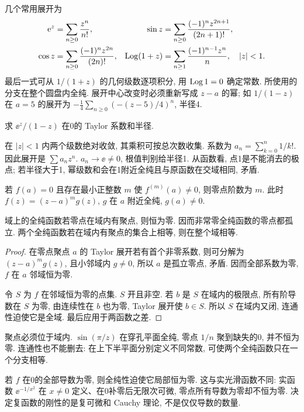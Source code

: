 几个常用展开为
\begin{align*}
\mathrm e^z&=\sum_{n\ge0}\frac{z^n}{n!},&
\sin z&=\sum_{n\ge0}\frac{(-1)^nz^{2n+1}}{(2n+1)!},\\
\cos z&=\sum_{n\ge0}\frac{(-1)^nz^{2n}}{(2n)!},&
\operatorname{Log}(1+z)&=\sum_{n\ge1}\frac{(-1)^{n-1}z^n}{n},\quad |z|<1.
\end{align*}
最后一式可从 $1/(1+z)$ 的几何级数逐项积分, 用 $\operatorname{Log}1=0$ 确定常数. 所使用的分支在整个圆盘内全纯. 展开中心改变时必须重新写成 $z-a$ 的幂; 如 $1/(1-z)$ 在 $a=5$ 的展开为 $-\tfrac14\sum_{n\ge0}(-(z-5)/4)^n$, 半径4.

\begin{example}
求 $\ee^z/(1-z)$ 在0的 Taylor 系数和半径.
\end{example}
\begin{solution}
在 $|z|<1$ 内两个级数绝对收敛, 其乘积可按总次数收集. 系数为 $a_n=\sum_{k=0}^n1/k!$. 因此展开是 $\sum a_nz^n$. $a_n\to\ee\ne0$, 根值判别给半径1. 从函数看, 点1是不能消去的极点; 若半径大于1, 幂级数和会在1附近全纯且与原函数在交域相同, 矛盾.
\end{solution}

\begin{definition}
若 $f(a)=0$ 且存在最小正整数 $m$ 使 $f^{(m)}(a)\ne0$, 则零点阶数为 $m$. 此时 $f(z)=(z-a)^mg(z)$, $g$ 在 $a$ 附近全纯, $g(a)\ne0$.
\end{definition}
\begin{theorem}[恒等定理]\label{thm:identity}
域上的全纯函数若零点在域内有聚点, 则恒为零. 因而非常零全纯函数的零点都孤立. 两个全纯函数若在域内有聚点的集合上相等, 则在整个域相等.
\end{theorem}
\begin{proof}
在零点聚点 $a$ 的 Taylor 展开若有首个非零系数, 则可分解为 $(z-a)^mg(z)$, 且小邻域内 $g\ne0$, 所以 $a$ 是孤立零点, 矛盾. 因而全部系数为零, $f$ 在 $a$ 邻域恒为零.

令 $S$ 为 $f$ 在邻域恒为零的点集. $S$ 开且非空. 若 $b$ 是 $S$ 在域内的极限点, 所有阶导数在 $S$ 为零, 由连续性在 $b$ 也为零, Taylor 展开使 $b\in S$. 所以 $S$ 在域内又闭, 连通性迫使它是全域. 最后应用于两函数之差.
\end{proof}
聚点必须位于域内. $\sin(\pi/z)$ 在穿孔平面全纯, 零点 $1/n$ 聚到缺失的0, 并不恒为零. 连通性也不能删去: 在上下半平面分别定义不同常数, 可使两个全纯函数只在一个分支相等.

若 $f$ 在0的全部导数为零, 则全纯性迫使它局部恒为零. 这与实光滑函数不同: 实函数 $\ee^{-1/x^2}$ 在 $x\ne0$ 定义、在0补零后无限次可微, 零点所有导数为零却不恒为零. 决定复函数的刚性的是复可微和 Cauchy 理论, 不是仅仅导数的数量.


